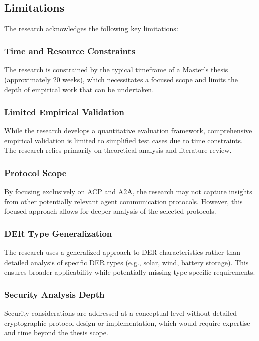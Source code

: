 \subsection{Limitations}

The research acknowledges the following key limitations:

\subsubsection{Time and Resource Constraints}
The research is constrained by the typical timeframe of a Master's thesis (approximately 20 weeks), which necessitates a focused scope and limits the depth of empirical work that can be undertaken.

\subsubsection{Limited Empirical Validation}
While the research develops a quantitative evaluation framework, comprehensive empirical validation is limited to simplified test cases due to time constraints. The research relies primarily on theoretical analysis and literature review.

\subsubsection{Protocol Scope}
By focusing exclusively on ACP and A2A, the research may not capture insights from other potentially relevant agent communication protocols. However, this focused approach allows for deeper analysis of the selected protocols.

\subsubsection{DER Type Generalization}
The research uses a generalized approach to DER characteristics rather than detailed analysis of specific DER types (e.g., solar, wind, battery storage). This ensures broader applicability while potentially missing type-specific requirements.

\subsubsection{Security Analysis Depth}
Security considerations are addressed at a conceptual level without detailed cryptographic protocol design or implementation, which would require expertise and time beyond the thesis scope.

